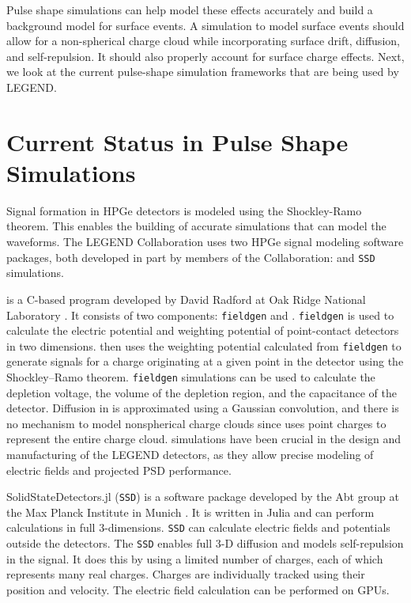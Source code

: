 Pulse shape simulations can help model these effects accurately and build a background model for surface events. A simulation to model surface events should allow for a non-spherical charge cloud while incorporating surface drift, diffusion, and self-repulsion. It should also properly account for surface charge effects. Next, we look at the current pulse-shape simulation frameworks that are being used by LEGEND.

\section{Current Status in Pulse Shape Simulations}
Signal formation in HPGe detectors is modeled using the Shockley-Ramo theorem. This enables the building of accurate simulations that can model the waveforms. The LEGEND Collaboration uses two HPGe signal modeling software packages, both developed in part by members of the Collaboration: {\siggen} and \texttt{SSD} simulations. 

{\siggen} is a C-based program developed by David Radford at Oak Ridge National Laboratory \cite{siggen_paper}. It consists of two components: \texttt{fieldgen} and {\siggen}. \texttt{fieldgen} is used to calculate the electric potential and weighting potential of point-contact detectors in two dimensions. {\siggen} then uses the weighting potential calculated from \texttt{fieldgen} to generate signals for a charge originating at a given point in the detector using the Shockley–Ramo theorem. \texttt{fieldgen} simulations can be used to calculate the depletion voltage, the volume of the depletion region, and the capacitance of the detector. Diffusion in {\siggen} is approximated using a Gaussian convolution, and there is no mechanism to model nonspherical charge clouds since {\siggen} uses point charges to represent the entire charge cloud. {\siggen} simulations have been crucial in the design and manufacturing of the LEGEND detectors, as they allow precise modeling of electric fields and projected PSD performance.


SolidStateDetectors.jl (\texttt{SSD}) is a software package developed by the Abt group at the Max Planck Institute in Munich \cite{Abt:2021SSD}. It is written in Julia and can perform calculations in full $3$-dimensions. \texttt{SSD} can calculate electric fields and potentials outside the detectors. The \texttt{SSD} enables full $3$-D diffusion and models self-repulsion in the signal. It does this by using a limited number of charges, each of which represents many real charges. Charges are individually tracked using their position and velocity. The electric field calculation can be performed on GPUs. 


